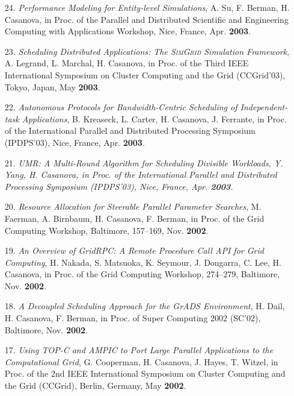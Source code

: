 \begin{enumerate}
\item [24.]
{\it Performance Modeling for Entity-level Simulations}, A. Su, F. Berman,
H. Casanova, in Proc. of the Parallel and Distributed Scientific
and Engineering Computing with Applications Workshop, Nice, France,
Apr. {\bf 2003}.

\item [23.]
{\it Scheduling Distributed Applications: The \textsc{SimGrid} Simulation
Framework}, A. Legrand, L. Marchal, H. Casanova, in Proc. of the
Third IEEE International Symposium on Cluster Computing and the Grid
(CCGrid'03), Tokyo, Japan, May {\bf 2003}.


\item[22.]
{\it Autonomous Protocols for Bandwidth-Centric Scheduling of
Independent-task Applications}, B. Kreaseck, L. Carter, H. Casanova,
J. Ferrante, in Proc. of the International Parallel and Distributed
Processing Symposium (IPDPS'03), Nice, France, Apr. {\bf 2003}.

\item [21.]
\it{UMR: A Multi-Round Algorithm for Scheduling Divisible Workloads},
Y. Yang, H. Casanova, in Proc. of the International Parallel
and Distributed Processing Symposium (IPDPS'03), Nice, France, Apr.
{\bf 2003}.

\item [20.]
{\it Resource Allocation for Steerable Parallel Parameter Searches},
M. Faerman, A. Birnbaum, H. Casanova, F. Berman, in Proc. of the
Grid Computing Workshop, Baltimore, 157--169, Nov. {\bf 2002}.

\item [19.]
{\it An Overview of GridRPC: A Remote Procedure Call API for Grid
Computing}, H. Nakada, S. Matsuoka, K. Seymour, J. Dongarra, C. Lee,
H. Casanova, in Proc. of the Grid Computing Workshop, 274--279,
Baltimore, Nov. {\bf 2002}.

\item [18.]
{\it A Decoupled Scheduling Approach for the GrADS Environment}, H. Dail,
H. Casanova, F. Berman, in Proc. of  Super Computing 2002 (SC'02),
Baltimore, Nov. {\bf 2002}.

\item[17.]
{\it Using TOP-C and AMPIC to Port Large Parallel Applications to the
Computational Grid}, G. Cooperman, H. Casanova, J. Hayes, T. Witzel, in
Proc. of the 2nd IEEE International Symposium on Cluster Computing
and the Grid (CCGrid), Berlin, Germany, May {\bf 2002}.


\end{enumerate}
